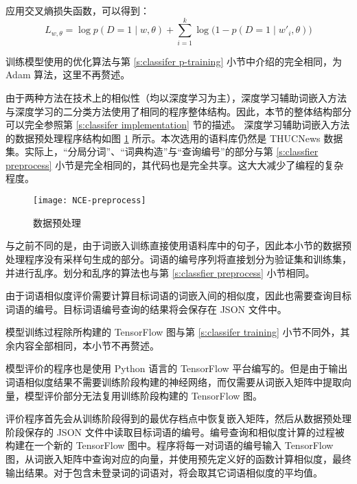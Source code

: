 应用交叉熵损失函数，可以得到：
\begin{equation}
L_{w, \theta} = \log p(D = 1 \mid w, \theta) + \sum_{i = 1}^{k} \log\bigl(1 - p(D = 1 \mid w'_i, \theta)\bigr)
\end{equation}

训练模型使用的优化算法与第 \ref{s:classifer p-training} 小节中介绍的完全相同，为 Adam 算法，这里不再赘述。

由于两种方法在技术上的相似性（均以深度学习为主），深度学习辅助词嵌入方法与深度学习的二分类方法使用了相同的程序整体结构。因此，本节的整体结构部分可以完全参照第 \ref{s:classifer implementation} 节的描述。
深度学习辅助词嵌入方法的数据预处理程序结构如图 \ref{f:nce preprocess} 所示。本次选用的语料库仍然是 THUCNews 数据集。实际上，“分局分词”、“词典构造”与“查询编号”的部分与第 \ref{s:classfier preprocess} 小节是完全相同的，其代码也是完全共享。这大大减少了编程的复杂程度。

\begin{figure}[h]
	\centering
	\texttt{[image: NCE-preprocess]}
	\caption{数据预处理}
	\label{f:nce preprocess}
	\vspace{-1em}
\end{figure}

与之前不同的是，由于词嵌入训练直接使用语料库中的句子，因此本小节的数据预处理程序没有采样句生成的部分。词语的编号序列将直接划分为验证集和训练集，并进行乱序。划分和乱序的算法也与第 \ref{s:classfier preprocess} 小节相同。

由于词语相似度评价需要计算目标词语的词嵌入间的相似度，因此也需要查询目标词语的编号。目标词语编号查询的结果将会保存在 JSON 文件中。

模型训练过程除所构建的 TensorFlow 图与第 \ref{s:classifer training} 小节不同外，其余内容全部相同，本小节不再赘述。

模型评价的程序也是使用 Python 语言的 TensorFlow 平台编写的。但是由于输出词语相似度结果不需要训练阶段构建的神经网络，而仅需要从词嵌入矩阵中提取向量，模型评价部分无法复用训练阶段构建的 TensorFlow 图。

评价程序首先会从训练阶段得到的最优存档点中恢复嵌入矩阵，然后从数据预处理阶段保存的 JSON 文件中读取目标词语的编号。编号查询和相似度计算的过程被构建在一个新的 TensorFlow 图中。程序将每一对词语的编号输入 TensorFlow 图，从词嵌入矩阵中查询对应的向量，并使用预先定义好的函数计算相似度，最终输出结果。对于包含未登录词的词语对，将会取其它词语相似度的平均值。

